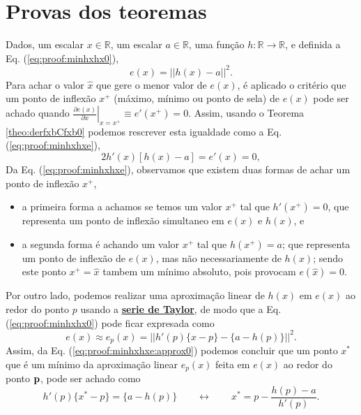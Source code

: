 \section{Provas dos teoremas}
 
\begin{myproofT}\label{proof:theo:minhxhx}
Dados,
um escalar $x \in \mathbb{R}$, 
um escalar $a \in \mathbb{R}$,  
uma função $h:\mathbb{R} \rightarrow \mathbb{R}$, e 
definida a Eq. (\ref{eq:proof:minhxhx0}),
\begin{equation}\label{eq:proof:minhxhx0}
e(x)=||h(x)-a||^2.
\end{equation}
Para achar o valor  $\hat{x}$ que gere o menor valor de $e(x)$, é aplicado
o critério que um ponto de inflexão $x^+$ (máximo, mínimo ou ponto de sela) de $e(x)$ 
pode ser achado quando 
$\left. \frac{\partial e(x)}{\partial x }\right|_{x=x^+} \equiv e'(x^+) =0$.
Assim, 
usando o Teorema \ref{theo:derfxbCfxb0} podemos 
rescrever esta igualdade como a Eq. (\ref{eq:proof:minhxhxe}),
\begin{equation}\label{eq:proof:minhxhxe}
2  h'(x) \left[h(x) -a\right] = e'(x)=0,
\end{equation}
Da Eq. (\ref{eq:proof:minhxhxe}), observamos 
que existem duas formas de achar um ponto de inflexão $x^+$,
\begin{itemize}
 \item a primeira forma a achamos se temos um valor $x^+$ tal que $h'(x^+)=0$, 
que representa um ponto de inflexão simultaneo em $e(x)$ e $h(x)$, e
 \item a segunda forma é achando um valor $x^+$ tal que $h(x^+)=a$;
que representa um ponto de inflexão de $e(x)$, mas não
necessariamente de $h(x)$; 
sendo este ponto $x^+=\hat{x}$ tambem um mínimo absoluto, pois provocam $e(\hat{x})=0$.
\end{itemize}




Por outro lado, podemos realizar uma aproximação linear de $h(x)$ em $e(x)$
ao redor do ponto $p$ usando a \hyperref[def:taylor]{\textbf{serie de Taylor}},
de modo que a Eq. (\ref{eq:proof:minhxhx0}) pode ficar expresada como
\begin{equation}\label{eq:proof:minhxhxe:approx0}
e(x) \approx  e_p(x) = ||h'(p)\{x-p\}-\{a-h(p)\}||^2.
\end{equation}
Assim, da Eq. (\ref{eq:proof:minhxhxe:approx0})
podemos concluir que um ponto $x^*$ que é 
um mínimo da aproximação linear $e_p(x)$ feita em $e(x)$ ao redor do ponto $\VECTOR{p}$,
pode ser achado como
\begin{equation}\label{eq:proof:minhxhx2}
 h'(p)\{x^*-p\} = \{a-h(p)\} \qquad \leftrightarrow \qquad x^* = p - \frac{h(p)-a}{ h'(p)}.
\end{equation} 


\end{myproofT}
